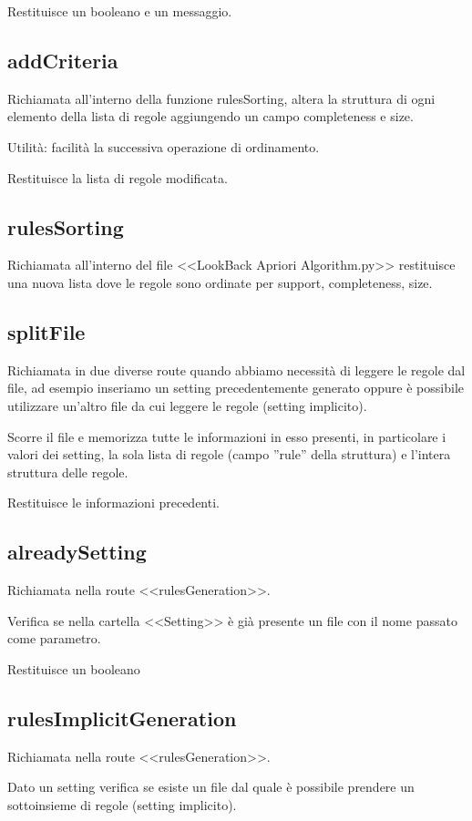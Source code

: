 \documentclass{article}
\begin{document}
Restituisce un booleano e un messaggio.

\subsection{addCriteria}
Richiamata all'interno della funzione rulesSorting, altera la struttura di ogni elemento della lista di regole aggiungendo un campo completeness e size.

Utilità: facilità la successiva operazione di ordinamento.

Restituisce la lista di regole modificata.

\subsection{rulesSorting}
Richiamata all'interno del file <<LookBack Apriori Algorithm.py>> restituisce una nuova lista dove le regole sono ordinate per support, completeness, size.

\subsection{splitFile}
Richiamata in due diverse route quando abbiamo necessità di leggere le regole dal file, ad esempio inseriamo un setting precedentemente generato oppure è possibile utilizzare un'altro file da cui leggere le regole (setting implicito).

Scorre il file e memorizza tutte le informazioni in esso presenti, in particolare i valori dei setting, la sola lista di regole (campo ''rule'' della struttura) e l'intera struttura delle regole.

Restituisce le informazioni precedenti.

\subsection{alreadySetting}
Richiamata nella route <<rulesGeneration>>.

Verifica se nella cartella <<Setting>> è già presente un file con il nome passato come parametro.

Restituisce un booleano

\subsection{rulesImplicitGeneration}
Richiamata nella route <<rulesGeneration>>.

Dato un setting verifica se esiste un file  dal quale è possibile prendere un sottoinsieme di regole (setting implicito).
\end{document}
